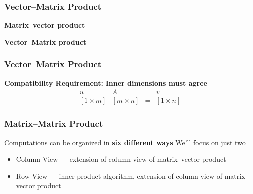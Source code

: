 \documentclass[10pt]{beamer}
\newcommand{\matdim}[2]{\ensuremath{#1\times#2}}
\begin{document}
\begin{frame}
\frametitle{Vector--Matrix Product}

\textbf{Matrix--vector product}
\begin{center}
\end{center}

\textbf{Vector--Matrix product}
\begin{center}
\end{center}

\end{frame}
\begin{frame}
\frametitle{Vector--Matrix Product}

\textbf{Compatibility Requirement:}
\textbf{Inner dimensions must agree}
\begin{equation*}
    \begin{array}{cccc}
                u       &        A        & = & v \\[3pt]
        [\matdim{1}{m}] & [\matdim{m}{n}] & = & [\matdim{1}{n}]
    \end{array}
\end{equation*}

\end{frame}
\begin{frame}
\frametitle{Matrix--Matrix Product}

Computations can be organized in \textbf{six different ways}
We'll focus on just two
\begin{itemize}
    \item   Column View --- extension of column view of matrix--vector product
    \item   Row View --- inner product algorithm, extension of column view of matrix--vector product
\end{itemize}

\end{frame}
\end{document}
